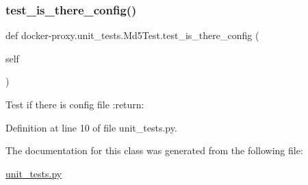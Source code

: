 \subsubsection{\texorpdfstring{test\+\_\+is\+\_\+there\+\_\+config()}{test\_is\_there\_config()}}
{\footnotesize\ttfamily def docker-\/proxy.\+unit\+\_\+tests.\+Md5\+Test.\+test\+\_\+is\+\_\+there\+\_\+config (\begin{DoxyParamCaption}\item[{}]{self }\end{DoxyParamCaption})}

\begin{DoxyVerb}Test if there is config file
:return:
\end{DoxyVerb}
 

Definition at line 10 of file unit\+\_\+tests.\+py.



The documentation for this class was generated from the following file\+:\begin{DoxyCompactItemize}
\item 
\hyperlink{unit__tests_8py}{unit\+\_\+tests.\+py}\end{DoxyCompactItemize}
